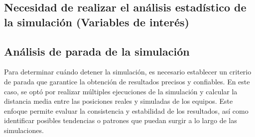 \documentclass{article}
\begin{document}
        \subsection{Necesidad de realizar el análisis estadístico de la simulación (Variables de interés)}

        \subsection{Análisis de parada de la simulación}
            Para determinar cuándo detener la simulación, es necesario establecer un criterio de parada que garantice la obtención de resultados precisos y confiables. En este caso, se optó por realizar múltiples ejecuciones de la simulación y calcular la distancia media entre las posiciones reales y simuladas de los equipos. Este enfoque permite evaluar la consistencia y estabilidad de los resultados, así como identificar posibles tendencias o patrones que puedan surgir a lo largo de las simulaciones.
\end{document}
